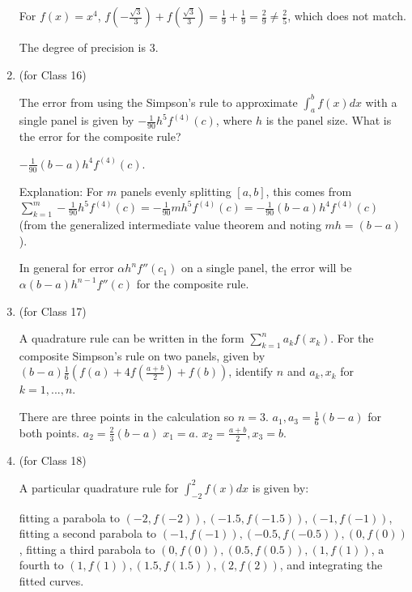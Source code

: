 \documentclass[12pt,letterpaper,answers]{exam}
\begin{document}
\begin{enumerate}
\begin{solution}
For $f(x) = x^4$, $f\left(-\frac{\sqrt{3}}{3}\right)+f\left(\frac{\sqrt{3}}{3}\right) = \frac{1}{9}+\frac{1}{9}=\frac{2}{9}\neq\frac{2}{5}$, which does not match.

The degree of precision is $3$.
\end{solution}

\item (for Class 16)

The error from using the Simpson's rule to approximate $\int_a^b f(x)dx$ with a single panel is given by $-\frac{1}{90}h^5f^{(4)}(c)$, where $h$ is the panel size.  What is the error for the composite rule?

\begin{solution}
$-\frac{1}{90}(b-a)h^4f^{(4)}(c)$.  

Explanation:
For $m$ panels evenly splitting $[a,b]$, this comes from $\sum\limits_{k=1}^m -\frac{1}{90}h^5f^{(4)}(c) = -\frac{1}{90}mh^5f^{(4)}(c) = -\frac{1}{90}(b-a)h^4f^{(4)}(c)$ (from the generalized intermediate value theorem and noting $mh = (b-a)$).

In general for error $\alpha h^nf''(c_1)$ on a single panel, the error will be $\alpha (b-a)h^{n-1}f''(c)$ for the composite rule.
\end{solution}

\item (for Class 17)

A quadrature rule can be written in the form $\sum\limits_{k=1}^n a_k f(x_k)$. For the composite Simpson's rule on two panels, given by $( b-a)\frac{1}{6}\left(f(a)+4f(\frac{a+b}{2})+f(b)\right)$, identify $n$ and $a_k, x_k$ for $k=1,...,n$.


\begin{solution}
There are three points in the calculation so $n = 3$.
$a_1, a_3 = \frac{1}{6}(b-a)$ for both points. $a_2= \frac{2}{3}(b-a)$ $x_1 = a$. $x_2 = \frac{a+b}{2}, x_3=b$.
\end{solution}



\item (for Class 18)

A particular quadrature rule for $\displaystyle\int_{-2}^2f(x)dx$ is given by:

fitting a parabola to $(-2,f(-2)), (-1.5,f(-1.5)), (-1,f(-1))$, fitting a second parabola to $(-1,f(-1)), (-0.5,f(-0.5)), (0,f(0))$, 
fitting a third parabola to $(0,f(0)), (0.5,f(0.5)), (1,f(1))$, a fourth to $(1,f(1)), (1.5,f(1.5)), (2,f(2))$, and integrating the fitted curves.


\end{enumerate}
\end{document}
